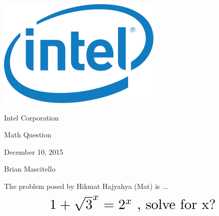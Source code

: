 \documentclass[12pt]{article}
\begin{document}
\begin{titlepage}
\begin{center}

\includegraphics[scale=0.5]{Intel.png}
\vspace{3 mm}

\huge{Intel Corporation}
\vspace{5 cm}

\huge{Math Question}
\vspace{3 mm}

\huge{December 10, 2015}
\vspace{7 cm}

\huge{Brian Mascitello}

\end{center}
\end{titlepage}


The problem posed by Hikmat Hajyahya (Mat) is ...
\[ \scalebox{2}{$1 + \sqrt{3}^x = 2^{x}$ , solve for x?} \]
\end{document}
